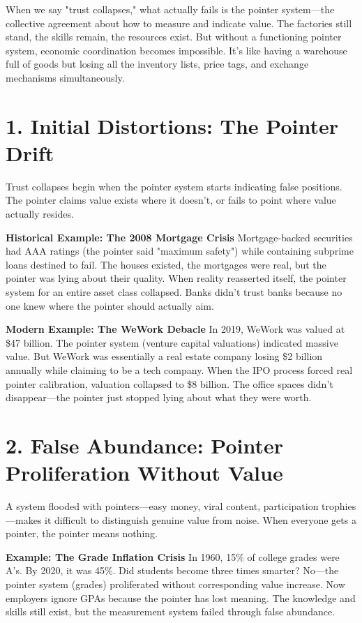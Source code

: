 \documentclass[11pt,oneside]{book}
\begin{document}
When we say "trust collapses," what actually fails is the pointer system—the collective agreement about how to measure and indicate value. The factories still stand, the skills remain, the resources exist. But without a functioning pointer system, economic coordination becomes impossible. It's like having a warehouse full of goods but losing all the inventory lists, price tags, and exchange mechanisms simultaneously.
\section{1. Initial Distortions: The Pointer Drift}

Trust collapses begin when the pointer system starts indicating false positions. The pointer claims value exists where it doesn't, or fails to point where value actually resides.

\textbf{Historical Example: The 2008 Mortgage Crisis}
Mortgage-backed securities had AAA ratings (the pointer said "maximum safety") while containing subprime loans destined to fail. The houses existed, the mortgages were real, but the pointer was lying about their quality. When reality reasserted itself, the pointer system for an entire asset class collapsed. Banks didn't trust banks because no one knew where the pointer should actually aim.

\textbf{Modern Example: The WeWork Debacle}
In 2019, WeWork was valued at \$47 billion. The pointer system (venture capital valuations) indicated massive value. But WeWork was essentially a real estate company losing \$2 billion annually while claiming to be a tech company. When the IPO process forced real pointer calibration, valuation collapsed to \$8 billion. The office spaces didn't disappear—the pointer just stopped lying about what they were worth.
\section{2. False Abundance: Pointer Proliferation Without Value}

A system flooded with pointers—easy money, viral content, participation trophies—makes it difficult to distinguish genuine value from noise. When everyone gets a pointer, the pointer means nothing.

\textbf{Example: The Grade Inflation Crisis}
In 1960, 15\% of college grades were A's. By 2020, it was 45\%. Did students become three times smarter? No—the pointer system (grades) proliferated without corresponding value increase. Now employers ignore GPAs because the pointer has lost meaning. The knowledge and skills still exist, but the measurement system failed through false abundance.
\end{document}
